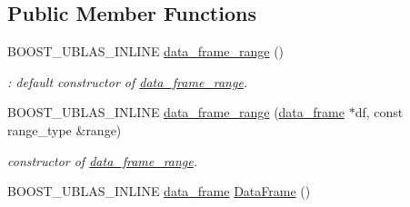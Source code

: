 \subsection*{Public Member Functions}
\begin{DoxyCompactItemize}
\item 
B\+O\+O\+S\+T\+\_\+\+U\+B\+L\+A\+S\+\_\+\+I\+N\+L\+I\+NE \hyperlink{classboost_1_1numeric_1_1ublas_1_1data__frame__range_a0d44306200160de0658458b18d445c56}{data\+\_\+frame\+\_\+range} ()\hypertarget{classboost_1_1numeric_1_1ublas_1_1data__frame__range_a0d44306200160de0658458b18d445c56}{}\label{classboost_1_1numeric_1_1ublas_1_1data__frame__range_a0d44306200160de0658458b18d445c56}

\begin{DoxyCompactList}\small\item\em \+: default constructor of \hyperlink{classboost_1_1numeric_1_1ublas_1_1data__frame__range}{data\+\_\+frame\+\_\+range}. \end{DoxyCompactList}\item 
B\+O\+O\+S\+T\+\_\+\+U\+B\+L\+A\+S\+\_\+\+I\+N\+L\+I\+NE \hyperlink{classboost_1_1numeric_1_1ublas_1_1data__frame__range_a4193ec3f79d994246ea04d24c0fd04f4}{data\+\_\+frame\+\_\+range} (\hyperlink{classboost_1_1numeric_1_1ublas_1_1data__frame}{data\+\_\+frame} $\ast$df, const range\+\_\+type \&range)
\begin{DoxyCompactList}\small\item\em constructor of \hyperlink{classboost_1_1numeric_1_1ublas_1_1data__frame__range}{data\+\_\+frame\+\_\+range}. \end{DoxyCompactList}\item 
B\+O\+O\+S\+T\+\_\+\+U\+B\+L\+A\+S\+\_\+\+I\+N\+L\+I\+NE \hyperlink{classboost_1_1numeric_1_1ublas_1_1data__frame}{data\+\_\+frame} \hyperlink{classboost_1_1numeric_1_1ublas_1_1data__frame__range_a8ff3d84317f7cfece38037188d0ff998}{Data\+Frame} ()\hypertarget{classboost_1_1numeric_1_1ublas_1_1data__frame__range_a8ff3d84317f7cfece38037188d0ff998}{}\label{classboost_1_1numeric_1_1ublas_1_1data__frame__range_a8ff3d84317f7cfece38037188d0ff998}


\end{DoxyCompactItemize}
